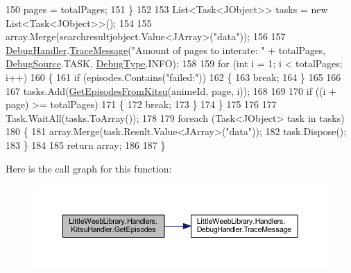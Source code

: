 \begin{DoxyCode}
150                 pages = totalPages;
151             \}
152 
153             List<Task<JObject>> tasks = \textcolor{keyword}{new} List<Task<JObject>>();   
154 
155             array.Merge(searchresultjobject.Value<JArray>(\textcolor{stringliteral}{"data"}));
156 
157             \mbox{\hyperlink{class_little_weeb_library_1_1_handlers_1_1_kitsu_handler_a6d3c55fa5eee15320845c2d902c96882}{DebugHandler}}.\mbox{\hyperlink{interface_little_weeb_library_1_1_handlers_1_1_i_debug_handler_a2e405bc3492e683cd3702fae125221bc}{TraceMessage}}(\textcolor{stringliteral}{"Amount of pages to interate: "} + totalPages,
       \mbox{\hyperlink{namespace_little_weeb_library_1_1_handlers_a2a6ca0775121c9c503d58aa254d292be}{DebugSource}}.TASK, \mbox{\hyperlink{namespace_little_weeb_library_1_1_handlers_ab66019ed40462876ec4e61bb3ccb0a62}{DebugType}}.INFO);
158 
159             \textcolor{keywordflow}{for} (\textcolor{keywordtype}{int} i = 1; i < totalPages; i++)
160             \{
161                 \textcolor{keywordflow}{if} (episodes.Contains(\textcolor{stringliteral}{"failed:"}))
162                 \{
163                     \textcolor{keywordflow}{break};
164                 \}
165 
166                 
167                 tasks.Add(\mbox{\hyperlink{class_little_weeb_library_1_1_handlers_1_1_kitsu_handler_a27b4c1e9d11ba03420fbd13166e0f95b}{GetEpisodesFromKitsu}}(animeId, page, i));
168                               
169 
170                 \textcolor{keywordflow}{if} ((i + page) >= totalPages)
171                 \{
172                     \textcolor{keywordflow}{break};
173                 \}
174             \}
175 
176 
177             Task.WaitAll(tasks.ToArray());
178 
179             \textcolor{keywordflow}{foreach} (Task<JObject> task \textcolor{keywordflow}{in} tasks)
180             \{
181                 array.Merge(task.Result.Value<JArray>(\textcolor{stringliteral}{"data"}));
182                 task.Dispose();
183             \}
184 
185             \textcolor{keywordflow}{return} array;           
186 
187         \}
\end{DoxyCode}
Here is the call graph for this function\+:\nopagebreak
\begin{figure}[H]
\begin{center}
\leavevmode
\includegraphics[width=350pt]{class_little_weeb_library_1_1_handlers_1_1_kitsu_handler_a615caf4bea96465d35eb36434bc71bea_cgraph}
\end{center}
\end{figure}
